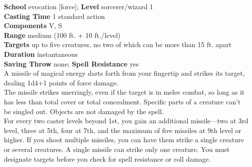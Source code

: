 \textbf{School} evocation [force]; \textbf{Level} sorcerer/wizard 1\\
\textbf{Casting Time} 1 standard action\\
\textbf{Components} V, S\\
\textbf{Range }medium (100 ft. + 10 ft./level)\\
\textbf{Targets} up to five creatures, no two of which can be more than 15 ft. apart\\
\textbf{Duration} instantaneous\\
\textbf{Saving Throw} none; \textbf{Spell Resistance} yes\\
A missile of magical energy darts forth from your fingertip and strikes its target, dealing 1d4+1 points of force damage.\\
The missile strikes unerringly, even if the target is in melee combat, so long as it has less than total cover or total concealment. Specific parts of a creature can't be singled out. Objects are not damaged by the spell.\\
For every two caster levels beyond 1st, you gain an additional missile—two at 3rd level, three at 5th, four at 7th, and the maximum of five missiles at 9th level or higher. If you shoot multiple missiles, you can have them strike a single creature or several creatures. A single missile can strike only one creature. You must designate targets before you check for spell resistance or roll damage.\\
